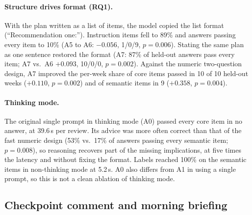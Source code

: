 \documentclass[10pt,twocolumn]{article}
\begin{document}
\paragraph{Structure drives format (RQ1).} With the plan written as a list of items, the model copied the list format
(``Recommendation one:''). Instruction items fell to 89\% and answers passing every item to 10\% (A5 to A6: $-0.056$,
1/0/9, $p=0.006$). Stating the same plan as one sentence restored the format (A7: 87\% of held-out answers pass
every item; A7 vs.\ A6 $+0.093$, 10/0/0, $p=0.002$). Against the numeric two-question design, A7 improved the
per-week share of core items passed in 10 of 10 held-out weeks ($+0.110$, $p=0.002$) and of semantic items in 9
($+0.358$, $p=0.004$).

\paragraph{Thinking mode.} The original single prompt in thinking mode (A0) passed every core item in no answer, at
39.6\,s per review. Its advice was more often correct than that of the fast numeric design (53\% vs.\ 17\% of answers
passing every semantic item; $p=0.008$), so reasoning recovers part of the missing implications, at five times the
latency and without fixing the format. Labels reached 100\% on the semantic items in non-thinking mode at 5.2\,s.
A0 also differs from A1 in using a single prompt, so this is not a clean ablation of thinking mode.

\subsection{Checkpoint comment and morning briefing}
\label{sec:res-messages}
\end{document}
